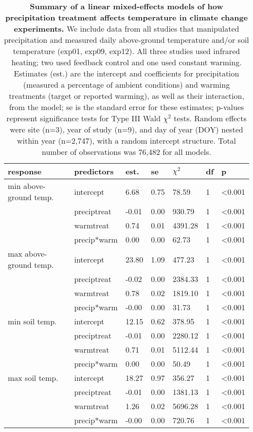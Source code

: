 \documentclass{article}
\begin{document}
\begin{table}[ht]
\centering
\caption{\textbf{Summary of a linear mixed-effects models of how precipitation treatment affects temperature in climate change experiments.} We include data from all studies that manipulated precipitation and measured daily above-ground temperature and/or soil temperature (exp01, exp09, exp12). All three studies used infrared heating; two used feedback control and one used constant warming. Estimates (est.) are the intercept and coefficients for precipitation (measured a percentage of ambient conditions) and warming treatments (target or reported warming), as well as their interaction, from the model; se is the standard error for these estimates; p-values represent significance tests for Type III Wald $\chi^{2}$ tests. Random effects were site (n=3), year of study (n=9), and day of year (DOY) nested within year (n=2,747), with a random intercept structure. Total number of observations was 76,482 for all models.} 
\label{table:preciptemp}
\begingroup\footnotesize
\begin{tabular}{|p{}|p{}|p{}|p{}|p{}|p{}|p{}|}
  \hline
response & predictors & est. & se & $\chi^{2}$ & df & p \\ 
  \hline
min above-ground temp. & intercept & 6.68 & 0.75 & 78.59 & 1 & <0.001 \\ 
   & preciptreat & -0.01 & 0.00 & 930.79 & 1 & <0.001 \\ 
   & warmtreat & 0.74 & 0.01 & 4391.28 & 1 & <0.001 \\ 
   & precip*warm & 0.00 & 0.00 & 62.73 & 1 & <0.001 \\ 
   \hline
max above-ground temp. & intercept & 23.80 & 1.09 & 477.23 & 1 & <0.001 \\ 
   & preciptreat & -0.02 & 0.00 & 2384.33 & 1 & <0.001 \\ 
   & warmtreat & 0.78 & 0.02 & 1819.10 & 1 & <0.001 \\ 
   & precip*warm & -0.00 & 0.00 & 31.73 & 1 & <0.001 \\ 
   \hline
min soil temp. & intercept & 12.15 & 0.62 & 378.95 & 1 & <0.001 \\ 
   & preciptreat & -0.01 & 0.00 & 2280.12 & 1 & <0.001 \\ 
   & warmtreat & 0.71 & 0.01 & 5112.44 & 1 & <0.001 \\ 
   & precip*warm & 0.00 & 0.00 & 50.49 & 1 & <0.001 \\ 
   \hline
max soil temp. & intercept & 18.27 & 0.97 & 356.27 & 1 & <0.001 \\ 
   & preciptreat & -0.01 & 0.00 & 1381.13 & 1 & <0.001 \\ 
   & warmtreat & 1.26 & 0.02 & 5696.28 & 1 & <0.001 \\ 
   & precip*warm & -0.00 & 0.00 & 720.76 & 1 & <0.001 \\ 
   \hline
\end{tabular}
\endgroup
\end{table}  %
\end{document}
